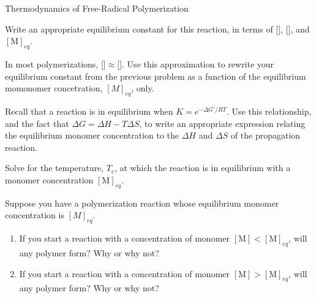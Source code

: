 \begin{activity}{Thermodynamics of Free-Radical Polymerization}
\begin{ctqs}
	\question Write an appropriate equilibrium constant for this reaction, in terms of [], [], and $[\text{M}]_{eq}$.
				
				\begin{solution}[1in]
				\end{solution}
	
	\question In most polymerizations, []$\approx$[].  Use this approximation to rewrite your equilibrium constant from the previous problem as a function of the equilibrium momonomer concetration, $[M]_{eq}$, only.
				
				\begin{solution}[1in]
				\end{solution}
	
	\question Recall that a reaction is in equilibrium when $K = e^{-\Delta G^\circ/RT}$.  Use this relationship, and the fact that $\Delta G = \Delta H - T\Delta S$, to write an appropriate expression relating the equilibrium monomer concentration to the $\Delta H$ and $\Delta S$ of the propagation reaction.
				
				\begin{solution}[1.5in]
				\end{solution}
	
	\question Solve for the temperature, $T_c$, at which the reaction is in equilibrium with a monomer concentration $[\text{M}]_{eq}$.
				
				\begin{solution}[2in]
				\end{solution}
	
	\question Suppose you have a polymerization reaction whose equilibrium monomer concentration is $[M]_{eq}$.  
		\begin{enumerate}
			\item If you start a reaction with a concentration of monomer $[\text{M}] < [\text{M}]_{eq}$, will any polymer form?  Why or why not?
				
				\begin{solution}[1.25in]
				\end{solution}
				
			\item If you start a reaction with a concentration of monomer $[\text{M}] > [\text{M}]_{eq}$, will any polymer form?  Why or why not?
				
				\begin{solution}[1.25in]
				\end{solution}
				

\end{enumerate}
\end{ctqs}
\end{activity}
